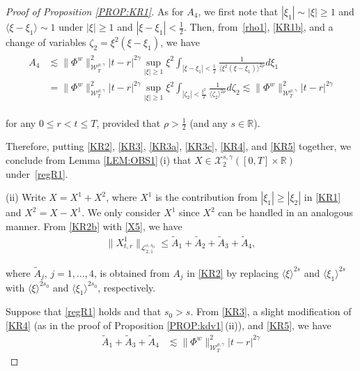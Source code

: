 \documentclass[letterpaper, 11pt,  reqno]{amsart}
\DeclareMathOperator*{\intt}{\int}
\newcommand{\1}{\hspace{0.5mm}\text{I}\hspace{0.5mm}}
\newcommand{\noi}{\noindent}
\newcommand{\R}{\mathbb{R}}
\newcommand{\g}{\gamma}
\newcommand{\wt}{\widetilde}
\newcommand{\les}{\lesssim}
\newcommand{\jb}[1]
{\langle #1 \rangle}
\newcommand{\cL}{\mathcal{L}}
\newcommand{\cX}{\mathcal{X}}
\newcommand{\W}{\mathcal{W}}
\newcommand{\z}{\zeta}
\numberwithin{equation}{section}
\numberwithin{theorem}{section}
\begin{document}
\begin{proof}[Proof of Proposition \ref{PROP:KR1}]
As for $A_4$, 
we first note that 
$ |\xi_1|\sim |\xi| \ge 1$
and $\jb{\xi - \xi_1}\sim 1$
under 
 $|\xi|\ge1$ and $|\xi - \xi_1|< \frac12 $.
 Then, from~\eqref{rho1}, \eqref{KR1b},  and 
 a change of variables $\zeta_2 = \xi^2 (\xi - \xi_1)$, we have 
 \begin{align}
\begin{aligned}
A_4
&\les
\|\Phi^w\|^2_{\W_T^{\rho,\g}}
|t-r |^{2\g }    \sup_{|\xi|\ge 1}  \xi^2
  \intt_{|\xi - \xi_1|< \frac 12} 
\frac{ 1}{  \jb{\xi^2(\xi - \xi_1)}^{2\rho}} d \xi_1\\
&= 
\|\Phi^w\|^2_{\W_T^{\rho,\g}}
|t-r |^{2\g }  
   \sup_{|\xi|\ge 1}  \xi^2
  \intt_{|\z_2|< \frac {\xi^2}2} 
 \frac{1}{\jb{\z_2}^{2\rho} }d \z_2
 \les \|\Phi^w\|^2_{\W_T^{\rho,\g}}
|t-r |^{2\g } 
\end{aligned}
\label{KR5}
\end{align}

\noi
for any $0 \le r <  t \le T$, provided that $\rho > \frac 12$
(and any $s \in \R$).



Therefore, putting \eqref{KR2}, 
\eqref{KR3}, 
\eqref{KR3a}, 
\eqref{KR3c}, 
\eqref{KR4}, and \eqref{KR5}
together, we conclude 
from  Lemma \ref{LEM:OBS1}\,(i)
that 
 $X\in  \cX^{s, \g}_2([0, T]\times \R)$ under~\eqref{regR1}.




\medskip

\noi
(ii)  Write $X = X^1 + X^2$, 
where $X^1$ is the contribution from $|\xi_1| \ge |\xi_2|$ in \eqref{KR1}
and $X^2 = X - X^1$.
We only consider $X^1$ since $X^2$ can be handled 
in an analogous manner.
From \eqref{KR2b}
with \eqref{X5}, we have 
\begin{align*}
\|X^1_{t,r} \|_{\cL_{2, 1}^{s, s_0}}
 \le \wt A_1+ \wt A_2 + \wt A_3 +\wt  A_4, 
\end{align*}




\noi
where $\wt A_j$, $j = 1, \dots, 4$, 
is obtained from $A_j$ in \eqref{KR2}
by replacing 
$\jb{\xi}^{2s}$
and $\jb{\xi_1}^{2s}$
with $\jb{\xi}^{2s_0}$
and $\jb{\xi_1}^{2s_0}$, respectively.
 

Suppose that  \eqref{regR1} holds and that $s_0 > s$.
From 
\eqref{KR3}, 
a slight modification of \eqref{KR4}
(as in the proof of Proposition \ref{PROP:kdv1}\,(ii)), and 
\eqref{KR5}, 
we have 
\begin{align*}
\wt A_1 + 
\wt A_3 + 
\wt A_4
& \les
\|\Phi^w\|^2_{\W_T^{\rho,\g}}|t-r |^{2\g}
\end{align*}


\end{proof}
\end{document}
